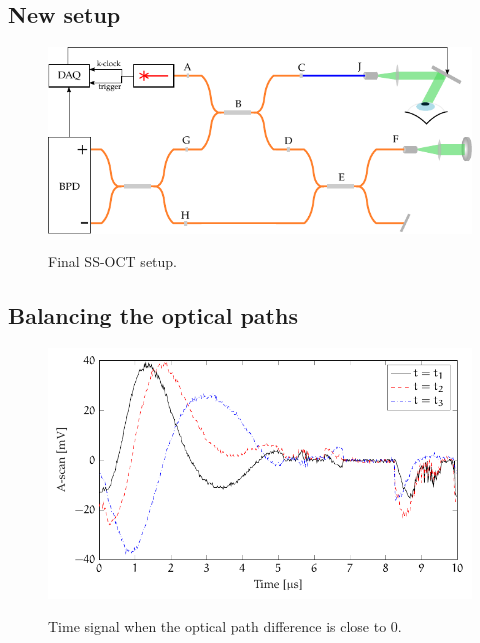 \subsection{New setup}
\begin{figure}[bth]
\myfloatalign
{\includegraphics[width=\linewidth]{gfx/setup-diagrams/final-setup.pdf}}
\caption{Final SS-OCT setup.}\label{fig:final-setup}
\end{figure}

\subsection{Balancing the optical paths}

\begin{figure}[hbt]
{\myfloatalign
\includegraphics[width=\linewidth]{gfx/tikz/balancing/balanced}}
\caption{Time signal when the optical path difference is close to 0.}\label{fig:signal-balanced}
\end{figure}

